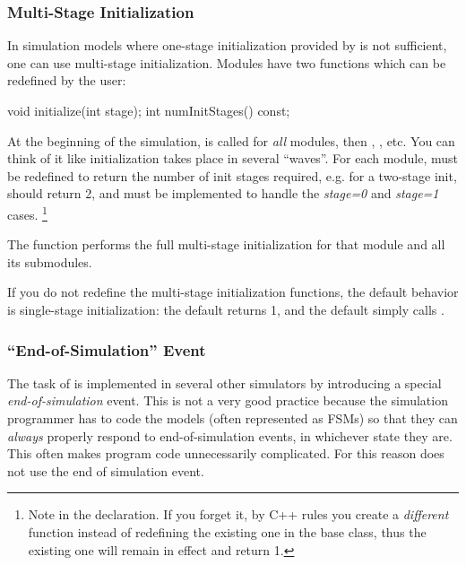 \subsubsection{Multi-Stage Initialization}
\label{sec:simple-modules:multi-stage-init}


In simulation models where one-stage
initialization provided by 
is not sufficient, one can use multi-stage
initialization.  Modules have two
functions which can be redefined by the user:

\begin{cpp}
void initialize(int stage);
int numInitStages() const;
\end{cpp}

At the beginning of the simulation, 
is called for \textit{all} modules, then ,
, etc. You can think of it like
initialization takes place in several ``waves''. For each module,
 must be redefined to return the number of init
stages required, e.g. for a two-stage init, 
should return 2, and  must be implemented to
handle the \textit{stage=0} and \textit{stage=1} cases.
  \footnote{Note  in the  declaration.
  If you forget it, by C++ rules you create a \textit{different} function
  instead of redefining the existing one in the base class, thus the
  existing one will remain in effect and return 1.}

The  function performs the full multi-stage initialization
for that module and all its submodules.

If you do not redefine the multi-stage initialization functions, the
default behavior is single-stage initialization: the default
 returns 1, and the default 
simply calls .


\subsubsection{``End-of-Simulation'' Event}

The task of  is implemented in several other simulators
by introducing a special \textit{end-of-simulation} event.
This is not a very good practice because the simulation programmer has to
code the models (often represented as FSMs) so that they can \textit{always}
properly respond to end-of-simulation events, in whichever state they are. This
often makes program code unnecessarily complicated.
 For this reason {\opp} does not use the end of simulation event.

